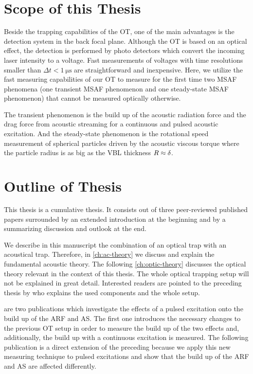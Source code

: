 \section{Scope of this Thesis}

Beside the trapping capabilities of the OT, one of the main advantages is the 
detection system in the back focal plane. Although the OT is based on an 
optical effect, the detection is performed by photo detectors which convert the 
incoming laser intensity to a voltage. Fast measurements of voltages with time 
resolutions smaller than $\Delta t < \SI{1}{\us}$ are straightforward and 
inexpensive. Here, we utilize the fast measuring capabilities of our OT to 
measure for the first time two MSAF phenomena (one transient MSAF phenomenon 
and one steady-state MSAF phenomenon) that cannot be measured optically 
otherwise.

The transient phenomenon is the build up of the acoustic radiation force and 
the drag force from acoustic streaming for a continuous and pulsed acoustic 
excitation. And the steady-state phenomenon is the rotational speed 
measurement of spherical particles driven by the acoustic viscous torque where 
the particle radius is as big as the VBL thickness $R\approx\delta$.

\section{Outline of Thesis\label{sec:I-outline}}

This thesis is a cumulative thesis. It consists out of three peer-reviewed 
published papers surrounded by an extended introduction at the beginning and by 
a summarizing discussion and outlook at the end.

We describe in this manuscript the combination of an optical trap with an 
acoustical trap. Therefore, in \cref{ch:ac-theory} we discuss and explain the 
fundamental acoustic theory. The following \cref{ch:optic-theory} discusses the 
optical theory relevant in the context of this thesis. The whole optical 
trapping setup will not be explained in great detail. Interested readers are 
pointed to the preceding thesis by  who explains the used 
components and the whole setup.

 are two publications which investigate the 
effects of a pulsed excitation onto the build up of the ARF and AS. The first 
one introduces the necessary changes to the previous OT setup in order to 
measure the build up of the two effects and, additionally, the build up with a 
continuous excitation is measured. The following publication is a direct 
extension of the preceding because we apply this new measuring technique to 
pulsed excitations and show that the build up of the ARF and AS are affected 
differently.

